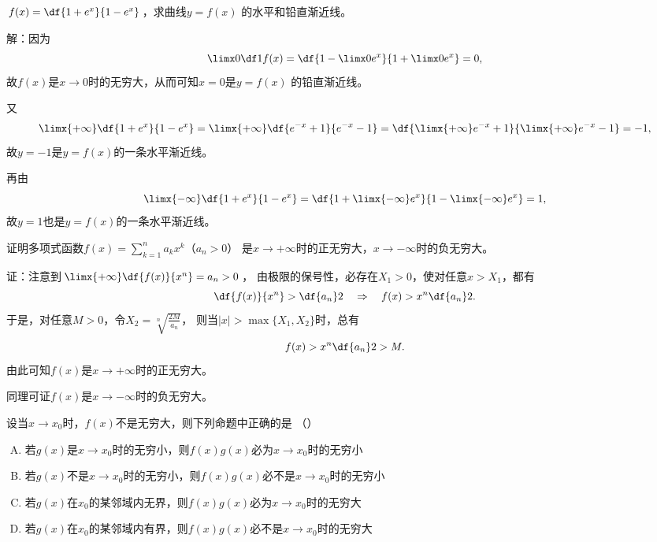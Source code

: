 \bs 
{}
\egz $f(x)=\df{1+e^x}{1-e^x}$，求曲线$y=f(x)$
的水平和铅直渐近线。

解：因为
$$\limx0\df1{f(x)}=\df{1-\limx0e^x}{1+\limx0e^x}=0,$$
故$f(x)$是$x\to 0$时的无穷大，从而可知$x=0$是$y=f(x)$
的铅直渐近线。

又
$$\limx{+\infty}\df{1+e^x}{1-e^x}
=\limx{+\infty}\df{e^{-x}+1}{e^{-x}-1}
=\df{\limx{+\infty}e^{-x}+1}{\limx{+\infty}e^{-x}-1}
=-1,$$
故$y=-1$是$y=f(x)$的一条水平渐近线。

再由
$$\limx{-\infty}\df{1+e^x}{1-e^x}
=\df{1+\limx{-\infty}e^x}{1-\limx{-\infty}e^x}=1,$$
故$y=1$也是$y=f(x)$的一条水平渐近线。\fin

\bs
\egz 证明多项式函数$f(x)=\sum\limits_{k=1}^{n}a_kx^k$（$a_n> 0$）
是$x\to+\infty$时的正无穷大，$x\to-\infty$时的负无穷大。

证：注意到$\limx{+\infty}\df{f(x)}{x^n}=a_n>0$，
由极限的保号性，必存在$X_1>0$，使对任意$x>X_1$，都有
$$\df{f(x)}{x^n}>\df{a_n}2\quad\Rightarrow
\quad f(x)>x^n\df{a_n}2.$$
于是，对任意$M>0$，令$X_2=\sqrt[n]{\frac{2M}{a_n}}$，
则当$|x|>\max\{X_1,X_2\}$时，总有
$$f(x)>x^n\df{a_n}2>M.$$
由此可知$f(x)$是$x\to+\infty$时的正无穷大。

同理可证$f(x)$是$x\to-\infty$时的负无穷大。
\fin

\bs
\egz 设当$x\to x_0$时，$f(x)$不是无穷大，则下列命题中正确的是
（\underline{\quad\quad}）
\begin{enumerate}[(A)]
  \setlength{\itemindent}{1cm}
  \item 若$g(x)$是$x\to x_0$时的无穷小，则$f(x)g(x)$必为$x\to x_0$时的无穷小
  \item 若$g(x)$不是$x\to x_0$时的无穷小，则$f(x)g(x)$必不是$x\to x_0$时的无穷小
  \item 若$g(x)$在$x_0$的某邻域内无界，则$f(x)g(x)$必为$x\to x_0$时的无穷大
  \item 若$g(x)$在$x_0$的某邻域内有界，则$f(x)g(x)$必不是$x\to x_0$时的无穷大
\end{enumerate}

